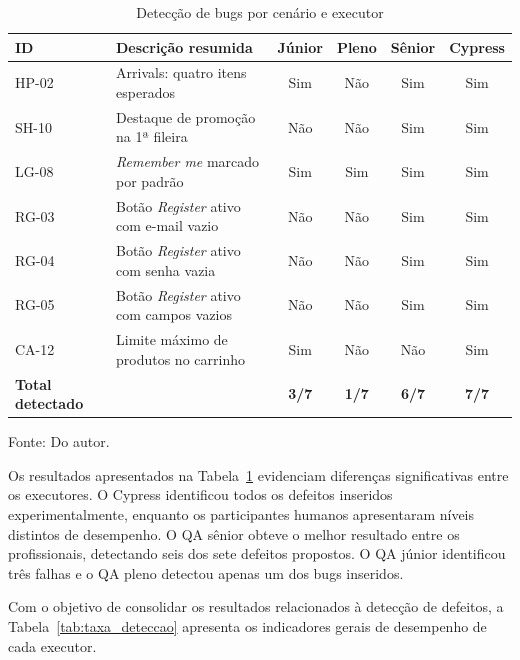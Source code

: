 \documentclass{UNESC}
\begin{document}
\begin{table}[H]
\captionsetup{skip=2pt, singlelinecheck=false, justification=centering}
\caption{Detecção de bugs por cenário e executor}
\label{tab:bugs_cenarios}
\renewcommand{\arraystretch}{1.0}
\setlength{\extrarowheight}{4pt}
\setlength{\tabcolsep}{6pt}
\begin{tabularx}{\textwidth}{l X c c c c}
\hline
\textbf{ID} & \textbf{Descrição resumida} & \textbf{Júnior} & \textbf{Pleno} & \textbf{Sênior} & \textbf{Cypress} \\
\hline
HP-02 & Arrivals: quatro itens esperados          & Sim & Não & Sim & Sim \\
SH-10 & Destaque de promoção na 1ª fileira        & Não & Não & Sim & Sim \\
LG-08 & \textit{Remember me} marcado por padrão   & Sim & Sim & Sim & Sim \\
RG-03 & Botão \textit{Register} ativo com e-mail vazio & Não & Não & Sim & Sim \\
RG-04 & Botão \textit{Register} ativo com senha vazia  & Não & Não & Sim & Sim \\
RG-05 & Botão \textit{Register} ativo com campos vazios & Não & Não & Sim & Sim \\
CA-12 & Limite máximo de produtos no carrinho     & Sim & Não & Não & Sim \\
\hline
\textbf{Total detectado} & & \textbf{3/7} & \textbf{1/7} & \textbf{6/7} & \textbf{7/7} \\
\hline
\end{tabularx}
\vspace{2mm}\par
\noindent Fonte: Do autor.
\end{table}

Os resultados apresentados na Tabela~\ref{tab:bugs_cenarios} evidenciam diferenças significativas entre os executores. O Cypress identificou todos os defeitos inseridos experimentalmente, enquanto os participantes humanos apresentaram níveis distintos de desempenho. O QA sênior obteve o melhor resultado entre os profissionais, detectando seis dos sete defeitos propostos. O QA júnior identificou três falhas e o QA pleno detectou apenas um dos bugs inseridos.

Com o objetivo de consolidar os resultados relacionados à detecção de defeitos, a Tabela~\ref{tab:taxa_deteccao} apresenta os indicadores gerais de desempenho de cada executor.
\end{document}
